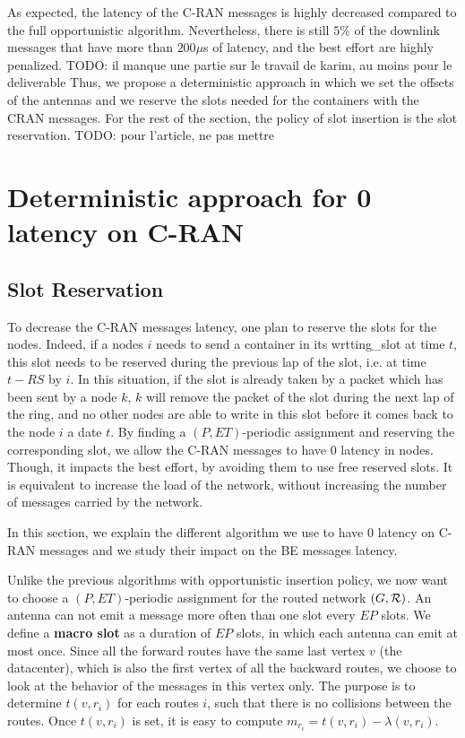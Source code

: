 \documentclass[a4paper,10pt,french,english]{article}
\newcommand{\todo}[1]{{\color{red} TODO: {#1}}}
\begin{document}
  As expected, the latency of the C-RAN messages is highly decreased compared to the full opportunistic algorithm. Nevertheless, there is still $5\%$ of the downlink messages that have more than $200 \mu$s of latency, and the best effort are highly penalized.
  \todo{il manque une partie sur le travail de karim, au moins pour le deliverable}
  Thus, we propose a deterministic approach in which we set the offsets of the antennas and we reserve the slots needed for the containers with the CRAN messages. For the rest of the section, the policy of slot insertion is the slot reservation. \todo{pour l'article, ne pas mettre}
  
  \section{Deterministic approach for 0 latency on C-RAN}
\label{det}
\subsection{Slot Reservation}
To decrease the C-RAN messages latency, one plan to reserve the slots for the nodes. Indeed, if a nodes $i$ needs to send a container in its wrtting\_slot at time $t$, this slot needs to be reserved during the previous lap of the slot, i.e. at time $t - RS$ by $i$. In this situation, if the slot is already taken by a packet which has been sent by a node $k$, $k$ will remove the packet of the slot during the next lap of the ring, and no other nodes are able to write in this slot before it comes back to the node $i$ a date $t$. By finding a $(P,ET)$-periodic assignment and reserving the corresponding slot, we allow the C-RAN messages to have $0$ latency in nodes. Though, it impacts the best effort, by avoiding them to use free reserved slots. It is equivalent to increase the load of the network, without increasing the number of messages carried by the network. 

In this section, we explain the different algorithm we use to have $0$ latency on C-RAN messages and we study their impact on the BE messages latency.
  
Unlike the previous algorithms with opportunistic insertion policy, we now want to choose a $(P,ET)$-periodic assignment for the routed network $(G,{\cal R})$. An antenna can not emit a message more often than one slot every $EP$ slots. We define a {\bf macro slot} as a duration of $EP$ slots, in which each antenna can emit at most once. Since all the forward routes have the same last vertex $v$ (the datacenter), which is also the first vertex of all the backward routes, we choose to look at the behavior of the messages in this vertex only. The purpose is to determine $t(v,r_i)$ for each routes $i$, such that there is no collisions between the routes. Once $t(v,r_i)$ is set, it is easy to compute $m_{r_i} = t(v,r_i) - \lambda(v,r_i)$.
\end{document}
